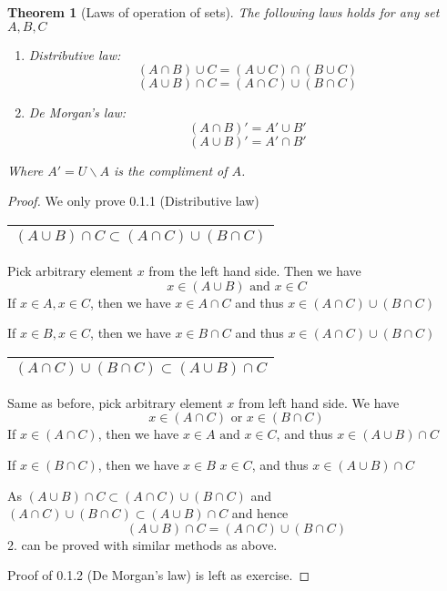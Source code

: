 \documentclass{article}
\theoremstyle{MyNonumberplain}
\theoremstyle{break}
\newtheorem*{proof}{Proof. }
\theoremstyle{break}
\newtheorem{theorem}{Theorem}[section]
\theoremstyle{break}
\theoremstyle{definition}
\theoremstyle{break}
\begin{document}
\begin{thmbox}
    \begin{theorem}[Laws of operation of sets]
        The following laws holds for any set $A,B,C$ \bigskip
        \begin{enumerate}
            \item Distributive law:\bigskip
                    $$(A\cap B)\cup C=(A\cup C)\cap (B\cup C)$$
                    $$(A\cup B)\cap C=(A\cap C)\cup (B\cap C)$$
            \item De Morgan's law:\bigskip
                    $$(A\cap B)'=A' \cup B'$$
                    $$(A\cup B)'=A' \cap B'$$
        \end{enumerate}
        Where $A'= U \backslash A$ is the compliment of $A$.
    \end{theorem}    
    \begin{prfbox}
        \begin{proof}
            We only prove 0.1.1 (Distributive law)
            
            \begin{tabular}{|c|}
              \hline
              $(A \cup B) \cap C \subset (A \cap C) \cup (B \cap C)$\\
              \hline
            \end{tabular}
            
            Pick arbitrary element $x$ from the left hand side. Then we have
            \[ x \in (A \cup B) \text{ and } x \in C \]
            If $x \in A, x \in C$, then we have $x \in A \cap C$ and thus $x \in (A \cap
            C) \cup (B \cap C)$
            
            If $x \in B, x \in C$, then we have $x \in B \cap C$ and thus $x \in (A \cap
            C) \cup (B \cap C)$
            
            \begin{tabular}{|c|}
              \hline
              $(A \cap C) \cup (B \cap C) \subset (A \cup B) \cap C$\\
              \hline
            \end{tabular}
            
            Same as before, pick arbitrary element $x$ from left hand side. We have
            \[ x \in (A \cap C) \text{ or } x \in (B \cap C) \]
            If $x \in (A \cap C)$, then we have $x \in A \text{ and } x \in C$, and thus $x
            \in (A \cup B) \cap C$
            
            If $x \in (B \cap C)$, then we have $x \in B$  $x \in C$, and thus $x \in
            (A \cup B) \cap C$
            
            As $(A \cup B) \cap C \subset (A \cap C) \cup (B \cap C)$ and $(A \cap C)
            \cup (B \cap C) \subset (A \cup B) \cap C$ and hence
            \[ (A \cup B) \cap C = (A \cap C) \cup (B \cap C) \]
            2. can be proved with similar methods as above.\bigskip

            Proof of 0.1.2 (De Morgan's law) is left as exercise.
          \end{proof}
    \end{prfbox}
\end{thmbox}
\end{document}
